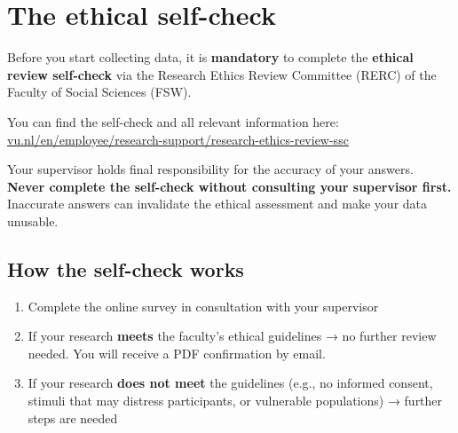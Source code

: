 \documentclass[
  11pt,
  a4paper,
]{scrbook}
\providecommand{\tightlist}{%
  \setlength{\itemsep}{0pt}\setlength{\parskip}{0pt}}\usepackage{longtable,booktabs,array}
\begin{document}
\section{The ethical self-check}\label{the-ethical-self-check}

Before you start collecting data, it is \textbf{mandatory} to complete
the \textbf{ethical review self-check} via the Research Ethics Review
Committee (RERC) of the Faculty of Social Sciences (FSW).

You can find the self-check and all relevant information here:
\href{https://vu.nl/en/employee/research-support/research-ethics-review-ssc}{vu.nl/en/employee/research-support/research-ethics-review-ssc}

\begin{tcolorbox}[enhanced jigsaw, bottomrule=.15mm, opacityback=0, toprule=.15mm, colframe=quarto-callout-important-color-frame, left=2mm, rightrule=.15mm, title=\textcolor{quarto-callout-important-color}{\faExclamation}\hspace{0.5em}{Always complete the self-check with your supervisor}, colbacktitle=quarto-callout-important-color!10!white, bottomtitle=1mm, colback=white, breakable, toptitle=1mm, titlerule=0mm, leftrule=.75mm, arc=.35mm, opacitybacktitle=0.6, coltitle=black]

Your supervisor holds final responsibility for the accuracy of your
answers. \textbf{Never complete the self-check without consulting your
supervisor first.} Inaccurate answers can invalidate the ethical
assessment and make your data unusable.

\end{tcolorbox}

\subsection{How the self-check works}\label{how-the-self-check-works}

\begin{enumerate}
\def\labelenumi{\arabic{enumi}.}
\tightlist
\item
  Complete the online survey in consultation with your supervisor
\item
  If your research \textbf{meets} the faculty's ethical guidelines → no
  further review needed. You will receive a PDF confirmation by email.
\item
  If your research \textbf{does not meet} the guidelines (e.g., no
  informed consent, stimuli that may distress participants, or
  vulnerable populations) → further steps are needed
\end{enumerate}
\end{document}
